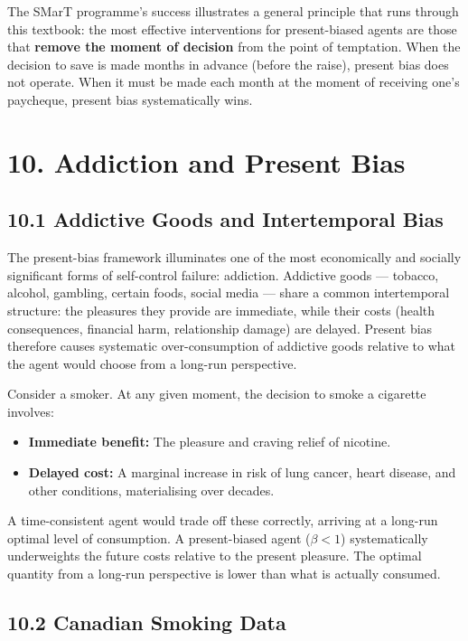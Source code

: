 \documentclass[12pt, letterpaper]{article}
\begin{document}
The SMarT programme's success illustrates a general principle that runs through this textbook: the most effective interventions for present-biased agents are those that \textbf{remove the moment of decision} from the point of temptation. When the decision to save is made months in advance (before the raise), present bias does not operate. When it must be made each month at the moment of receiving one's paycheque, present bias systematically wins.

\medskip


\section{10. Addiction and Present Bias}



\subsection{10.1 Addictive Goods and Intertemporal Bias}


The present-bias framework illuminates one of the most economically and socially significant forms of self-control failure: addiction. Addictive goods --- tobacco, alcohol, gambling, certain foods, social media --- share a common intertemporal structure: the pleasures they provide are immediate, while their costs (health consequences, financial harm, relationship damage) are delayed. Present bias therefore causes systematic over-consumption of addictive goods relative to what the agent would choose from a long-run perspective.

Consider a smoker. At any given moment, the decision to smoke a cigarette involves:
\begin{itemize}
\item \textbf{Immediate benefit:} The pleasure and craving relief of nicotine.
\item \textbf{Delayed cost:} A marginal increase in risk of lung cancer, heart disease, and other conditions, materialising over decades.
\end{itemize}

A time-consistent agent would trade off these correctly, arriving at a long-run optimal level of consumption. A present-biased agent ($\beta < 1$) systematically underweights the future costs relative to the present pleasure. The optimal quantity from a long-run perspective is lower than what is actually consumed.


\subsection{10.2 Canadian Smoking Data}
\end{document}

